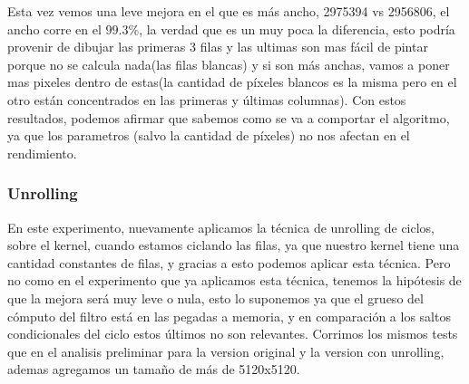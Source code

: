 Esta vez vemos una leve mejora en el que es más ancho, 2975394 vs 2956806, el ancho corre en el $99.3\%$, la verdad que es un muy poca la diferencia, esto podría provenir de dibujar las primeras 3 filas y las ultimas son mas fácil de pintar porque no se calcula nada(las filas blancas) y si son más anchas, vamos a poner mas pixeles dentro de estas(la cantidad de píxeles blancos es la misma pero en el otro están concentrados en las primeras y últimas columnas). Con estos resultados, podemos afirmar que sabemos como se va a comportar el algoritmo, ya que los parametros (salvo la cantidad de píxeles) no nos afectan en el rendimiento.

\subsubsection*{Unrolling}

En este experimento, nuevamente aplicamos la técnica de unrolling de ciclos, sobre el kernel, cuando estamos ciclando las filas, ya que nuestro kernel tiene una cantidad constantes de filas, y gracias a esto podemos aplicar esta técnica. Pero no como en el experimento que ya aplicamos esta técnica, tenemos la hipótesis de que la mejora será muy leve o nula, esto lo suponemos ya que el grueso del cómputo del filtro está en las pegadas a memoria, y en comparación a los saltos condicionales del ciclo estos últimos no son relevantes. Corrimos los mismos tests que en el analisis preliminar para la version original y la version con unrolling, ademas agregamos un tamaño de más de 5120x5120.

